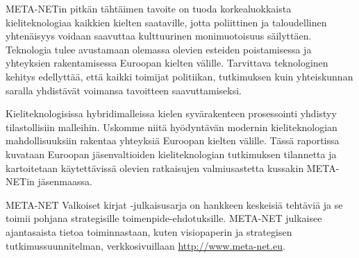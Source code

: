 \begin{multicols}{2}


META-NETin pitkän tähtäimen tavoite on tuoda korkealuokkaista kieliteknologiaa kaikkien kielten saataville, jotta poliittinen ja taloudellinen yhtenäisyys voidaan saavuttaa kulttuurinen monimuotoisuus säilyttäen. Teknologia tulee avustamaan olemassa olevien esteiden poistamisessa ja yhteyksien rakentamisessa Euroopan kielten välille. Tarvittava teknologinen kehitys edellyttää, että kaikki toimijat politiikan, tutkimuksen kuin yhteiskunnan saralla yhdistävät voimansa tavoitteen saavuttamiseksi.

Kieliteknologisissa hybridimalleissa kielen syvärakenteen prosessointi yhdistyy tilastollisiin malleihin. Uskomme niitä hyödyntävän modernin kieliteknologian mahdollisuuksiin rakentaa yhteyksiä Euroopan kielten välille. Tässä raportissa kuvataan Euroopan jäsenvaltioiden kieliteknologian tutkimuksen tilannetta ja kartoitetaan käytettävissä olevien ratkaisujen valmiusastetta kussakin META-NETin jäsenmaassa.

META-NET Valkoiset kirjat -julkaisusarja on hankkeen keskeisiä tehtäviä ja se toimii pohjana strategisille toimenpide-ehdotuksille. META-NET julkaisee ajantasaista tietoa toiminnastaan, kuten visiopaperin \cite{Vision} ja strategisen tutkimussuunnitelman, verkkosivuillaan \url{http://www.meta-net.eu}.  
\end{multicols}

\clearpage

